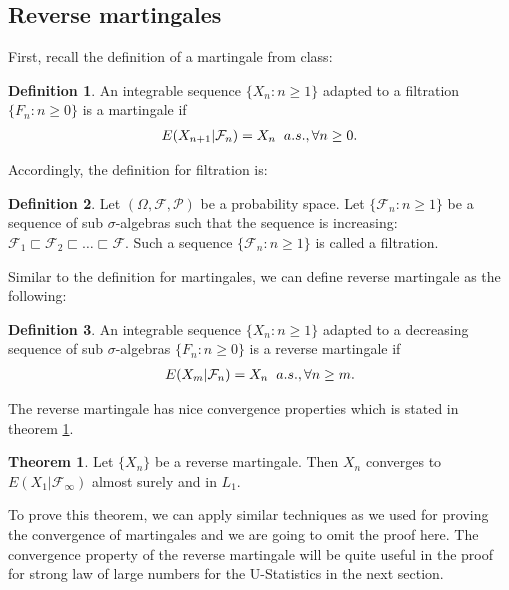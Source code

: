 \documentclass{article}
\theoremstyle{definition}
\newtheorem{theorem}{Theorem}
\newtheorem{Def}{Definition}
\numberwithin{Def}{section}
\begin{document}
\subsection{Reverse martingales}
First, recall the definition of a martingale from class:
\begin{Def}
An integrable sequence $\{X_n: n\ge 1\}$ adapted to a filtration $\{F_n: n\ge 0\}$ is a martingale if
\begin{align*}
 E(X_{n+1}|\mathcal{F}_n)=X_n \hspace{0.2cm} a.s., \forall n\ge0.
\end{align*}
\end{Def}

Accordingly, the definition for filtration is:
\begin{Def}
Let $(\Omega, \mathcal{F}, \mathcal{P})$ be a probability space. Let $\{\mathcal{F}_n: n\ge1\}$ be a sequence of sub $\sigma$-algebras such that the sequence is increasing: $\mathcal{F}_1 \sqsubset \mathcal{F}_2 \sqsubset \dotsc \sqsubset \mathcal{F}$. Such a sequence $\{\mathcal{F}_n: n\ge1\}$ is called a filtration. 
\end{Def}

Similar to the definition for martingales, we can define reverse martingale as the following:
\begin{Def}
An integrable sequence $\{X_n: n\ge 1\}$ adapted to a decreasing sequence of sub $\sigma$-algebras $\{F_n: n\ge 0\}$ is a reverse martingale if
\begin{align*}
 E(X_m|\mathcal{F}_n)=X_n \hspace{0.2cm} a.s., \forall n\ge m.
\end{align*}
\end{Def}

The reverse martingale has nice convergence properties which is stated in theorem \ref{conv_rm}.
\begin{theorem}\label{conv_rm}
Let $\{X_n\}$ be a reverse martingale. Then $X_n$ converges to $E(X_1|\mathcal{F}_{\infty})$ almost surely and in $L_1$. 
\end{theorem}
To prove this theorem, we can apply similar techniques as we used for proving the convergence of martingales and we are going to omit the proof here. The convergence property of the reverse martingale will be quite useful in the proof for strong law of large numbers for the U-Statistics in the next section.
\end{document}
